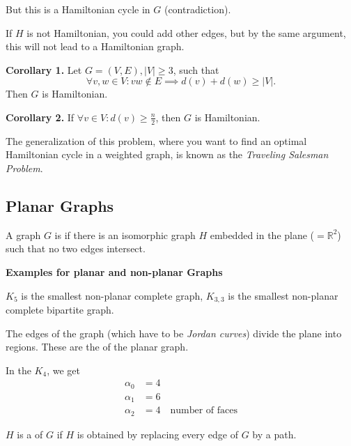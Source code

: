 But this is a Hamiltonian cycle in $G$ (contradiction).

If $H$ is not Hamiltonian, you could add other edges, but by the same argument, this will not lead to a Hamiltonian graph.

\textbf{Corollary 1.}
Let $G=(V,E), |V| ≥ 3$, such that
\[
    \forall v,w\in V: vw\not\in E\implies d(v) + d(w) \geq |V|.
\]
Then $G$ is Hamiltonian.

\textbf{Corollary 2.}
If
$\forall v \in V : d(v) \geq \frac{n}{2}$,
then $G$ is Hamiltonian.

The generalization of this problem, where you want to find an optimal Hamiltonian cycle in a weighted graph, is known as the \emph{Traveling Salesman Problem}.


\subsection{Planar Graphs}

\begin{definition}
A graph $G$ is  if there is an isomorphic graph $H$ embedded in the plane ($= \mathbb{R}^2$) such that no two edges intersect.
\end{definition}

\textbf{Examples for planar and non-planar Graphs}


$K_5$ is the smallest non-planar complete graph, $K_{3,3}$ is the smallest non-planar complete bipartite graph.

\begin{definition}
The edges of the graph (which have to be \emph{Jordan curves}) divide the plane into regions. These are the  of the planar graph.
\end{definition}



In the $K_4$, we get
\begin{align*}
    \alpha_0 &= 4 \\
    \alpha_1 &= 6 \\
    \alpha_2 &= 4\quad\text{number of faces}
\end{align*}

\begin{definition}
$H$ is a  of $G$ if $H$ is obtained by replacing every edge of $G$ by a path.
\end{definition}


